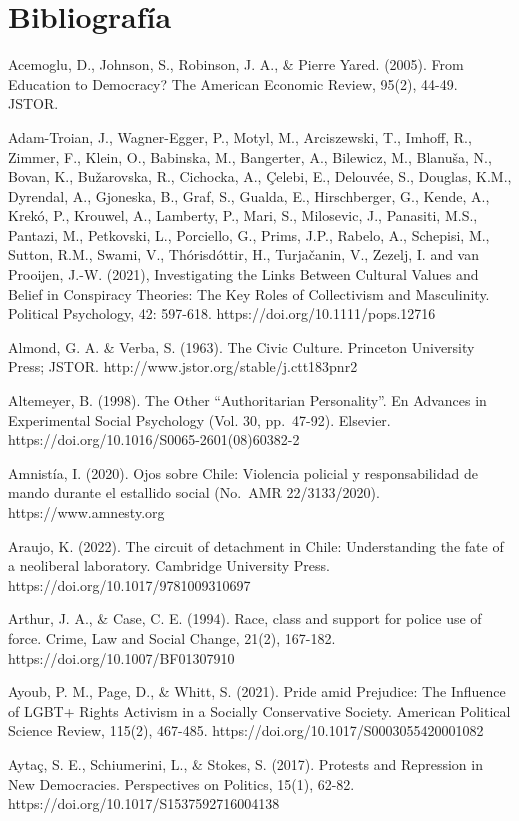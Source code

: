 \documentclass[
  13pt,
]{article}
\begin{document}
\section{Bibliografía}\label{bibliografuxeda}

Acemoglu, D., Johnson, S., Robinson, J. A., \& Pierre Yared. (2005).
From Education to Democracy? The American Economic Review, 95(2), 44-49.
JSTOR.

Adam-Troian, J., Wagner-Egger, P., Motyl, M., Arciszewski, T., Imhoff,
R., Zimmer, F., Klein, O., Babinska, M., Bangerter, A., Bilewicz, M.,
Blanuša, N., Bovan, K., Bužarovska, R., Cichocka, A., Çelebi, E.,
Delouvée, S., Douglas, K.M., Dyrendal, A., Gjoneska, B., Graf, S.,
Gualda, E., Hirschberger, G., Kende, A., Krekó, P., Krouwel, A.,
Lamberty, P., Mari, S., Milosevic, J., Panasiti, M.S., Pantazi, M.,
Petkovski, L., Porciello, G., Prims, J.P., Rabelo, A., Schepisi, M.,
Sutton, R.M., Swami, V., Thórisdóttir, H., Turjačanin, V., Zezelj, I.
and van Prooijen, J.-W. (2021), Investigating the Links Between Cultural
Values and Belief in Conspiracy Theories: The Key Roles of Collectivism
and Masculinity. Political Psychology, 42: 597-618.
https://doi.org/10.1111/pops.12716

Almond, G. A. \& Verba, S. (1963). The Civic Culture. Princeton
University Press; JSTOR. http://www.jstor.org/stable/j.ctt183pnr2

Altemeyer, B. (1998). The Other ``Authoritarian Personality''. En
Advances in Experimental Social Psychology (Vol. 30, pp.~47-92).
Elsevier. https://doi.org/10.1016/S0065-2601(08)60382-2

Amnistía, I. (2020). Ojos sobre Chile: Violencia policial y
responsabilidad de mando durante el estallido social (No.~AMR
22/3133/2020). https://www.amnesty.org

Araujo, K. (2022). The circuit of detachment in Chile: Understanding the
fate of a neoliberal laboratory. Cambridge University Press.
https://doi.org/10.1017/9781009310697

Arthur, J. A., \& Case, C. E. (1994). Race, class and support for police
use of force. Crime, Law and Social Change, 21(2), 167-182.
https://doi.org/10.1007/BF01307910

Ayoub, P. M., Page, D., \& Whitt, S. (2021). Pride amid Prejudice: The
Influence of LGBT+ Rights Activism in a Socially Conservative Society.
American Political Science Review, 115(2), 467-485.
https://doi.org/10.1017/S0003055420001082

Aytaç, S. E., Schiumerini, L., \& Stokes, S. (2017). Protests and
Repression in New Democracies. Perspectives on Politics, 15(1), 62-82.
https://doi.org/10.1017/S1537592716004138
\end{document}
